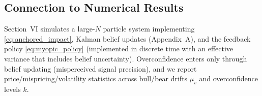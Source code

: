 \subsection{Connection to Numerical Results}

Section~VI simulates a large-$N$ particle system implementing \eqref{eq:anchored_impact}, Kalman belief updates (Appendix~A), and the feedback policy \eqref{eq:myopic_policy} (implemented in discrete time with an effective variance that includes belief uncertainty). Overconfidence enters only through belief updating (misperceived signal precision), and we report price/mispricing/volatility statistics across bull/bear drifts $\mu_v$ and overconfidence levels $k$.
